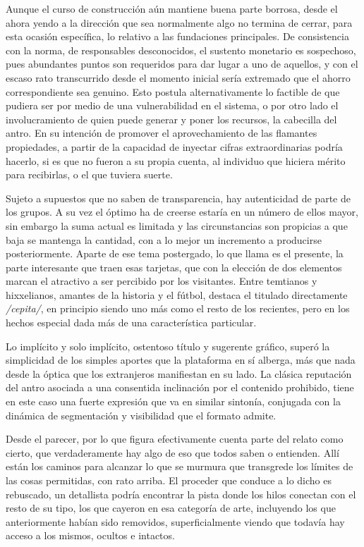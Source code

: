 \documentclass[
]{book}
\begin{document}
Aunque el curso de construcción aún mantiene buena parte borrosa, desde el ahora yendo a la dirección que sea normalmente algo no termina de cerrar, para esta ocasión específica, lo relativo a las fundaciones principales. De consistencia con la norma, de responsables desconocidos, el sustento monetario es sospechoso, pues abundantes puntos son requeridos para dar lugar a uno de aquellos, y con el escaso rato transcurrido desde el momento inicial sería extremado que el ahorro correspondiente sea genuino. Esto postula alternativamente lo factible de que pudiera ser por medio de una vulnerabilidad en el sistema, o por otro lado el involucramiento de quien puede generar y poner los recursos, la cabecilla del antro. En su intención de promover el aprovechamiento de las flamantes propiedades, a partir de la capacidad de inyectar cifras extraordinarias podría hacerlo, si es que no fueron a su propia cuenta, al individuo que hiciera mérito para recibirlas, o el que tuviera suerte.

Sujeto a supuestos que no saben de transparencia, hay autenticidad de parte de los grupos. A su vez el óptimo ha de creerse estaría en un número de ellos mayor, sin embargo la suma actual es limitada y las circunstancias son propicias a que baja se mantenga la cantidad, con a lo mejor un incremento a producirse posteriormente. Aparte de ese tema postergado, lo que llama es el presente, la parte interesante que traen esas tarjetas, que con la elección de dos elementos marcan el atractivo a ser percibido por los visitantes. Entre temtianos y hixxelianos, amantes de la historia y el fútbol, destaca el titulado directamente \emph{/cepita/}, en principio siendo uno más como el resto de los recientes, pero en los hechos especial dada más de una característica particular.

Lo implícito y solo implícito, ostentoso título y sugerente gráfico, superó la simplicidad de los simples aportes que la plataforma en sí alberga, más que nada desde la óptica que los extranjeros manifiestan en su lado. La clásica reputación del antro asociada a una consentida inclinación por el contenido prohibido, tiene en este caso una fuerte expresión que va en similar sintonía, conjugada con la dinámica de segmentación y visibilidad que el formato admite.

Desde el parecer, por lo que figura efectivamente cuenta parte del relato como cierto, que verdaderamente hay algo de eso que todos saben o entienden. Allí están los caminos para alcanzar lo que se murmura que transgrede los límites de las cosas permitidas, con rato arriba. El proceder que conduce a lo dicho es rebuscado, un detallista podría encontrar la pista donde los hilos conectan con el resto de su tipo, los que cayeron en esa categoría de arte, incluyendo los que anteriormente habían sido removidos, superficialmente viendo que todavía hay acceso a los mismos, ocultos e intactos.
\end{document}

